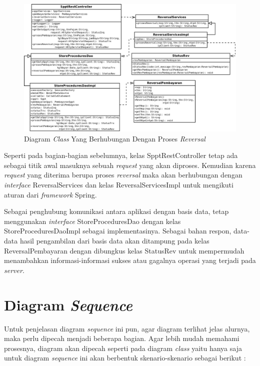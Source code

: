 \begin{enumerate}
  \begin{figure}[H]
    \centering
    \includegraphics[width=1\textwidth]{./resources/uml/uml-class-rev}
    \caption{Diagram \textit{Class} Yang Berhubungan Dengan Proses \textit{Reversal}}
    \label{fig:uml-class-rev}
  \end{figure}
  
  Seperti pada bagian-bagian sebelumnya, kelas SpptRestController tetap ada sebagai titik awal masuknya sebuah \textit{request} yang akan diproses. Kemudian karena \textit{request} yang diterima berupa proses \textit{reversal} maka akan berhubungan dengan \textit{interface} ReversalServices dan kelas ReversalServicesImpl untuk mengikuti aturan dari \textit{framework} Spring.
  
  Sebagai penghubung komunikasi antara aplikasi dengan basis data, tetap menggunakan \textit{interface} StoreProceduresDao dengan kelas StoreProceduresDaoImpl sebagai implementasinya. Sebagai bahan respon, data-data hasil pengambilan dari basis data akan ditampung pada kelas ReversalPembayaran dengan dibungkus kelas StatusRev untuk mempermudah menambahkan informasi-informasi sukses atau gagalnya operasi yang terjadi pada \textit{server}.
  
\end{enumerate}

\section{Diagram \textit{Sequence}}

Untuk penjelasan diagram \textit{sequence} ini pun, agar diagram terlihat jelas alurnya, maka perlu dipecah menjadi beberapa bagian. Agar lebih mudah memahami prosesnya, diagram akan dipecah seperti pada diagram \textit{class} yaitu hanya saja untuk diagram \textit{sequence} ini akan berbentuk skenario-skenario sebagai berikut :

